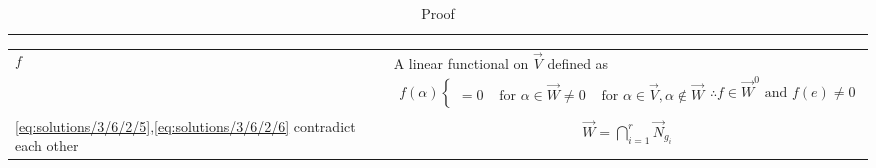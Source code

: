 \begin{table*}[!t]
{\begin{tabular}{|l|l|}
{\begin{align}
       \end{align}}\\
       \hline
       $f$ &
       \parbox{10cm}{A linear functional on $\vec{V}$ defined as\\
       \begin{align}
         f(\alpha)
         \begin{cases}
         = 0 & \text{ for }     \alpha \in \vec{W}\\
         \neq 0 & \text{ for } \alpha \in \vec{V},\alpha \notin \vec{W}
       \end{cases}\\
        \therefore f \in \vec{W}^0 \text{ and } f(e) \neq 0  \label{eq:solutions/3/6/2/6}
       \end{align}}\\
       \hline
       \eqref{eq:solutions/3/6/2/5},\eqref{eq:solutions/3/6/2/6} contradict each other & 
       \parbox{10cm}{\begin{align}
          \vec{W}=\bigcap_{i=1}^r \vec{N}_{g_i}
       \end{align}}\\
       \hline
    \end{tabular}
}
    \caption{Proof}
\label{eq:table/solutions/3/6/2/2}
\end{table*}


